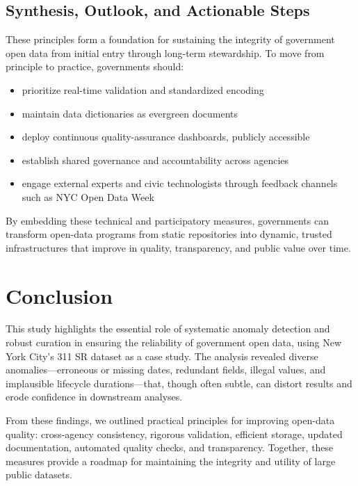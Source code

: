 \documentclass[linenumber]{jdsart}
\begin{document}
\subsection{Synthesis, Outlook, and Actionable Steps}
\label{subsec:actions}

These principles form a foundation for sustaining the integrity of government
open data from initial entry through long-term stewardship. To move from
principle to practice, governments should:

\begin{itemize}[left=1.5em]
  \item prioritize real-time validation and standardized encoding
  \item maintain data dictionaries as evergreen documents
  \item deploy continuous quality-assurance dashboards, publicly accessible
  \item establish shared governance and accountability across agencies
  \item engage external experts and civic technologists through feedback channels such as NYC Open Data Week
\end{itemize}

By embedding these technical and participatory measures, governments can
transform open-data programs from static repositories into dynamic, trusted
infrastructures that improve in quality, transparency, and public value over
time.




\section{Conclusion}
\label{sec:conclusion}
This study highlights the essential role of systematic anomaly detection and 
robust curation in ensuring the reliability of government open data, using 
New York City’s 311 SR dataset as a case study. 
The analysis revealed diverse anomalies—erroneous or missing dates, redundant 
fields, illegal values, and implausible lifecycle durations—that, though often subtle, can distort 
results and erode confidence in downstream analyses.

From these findings, we outlined practical principles for improving open-data 
quality: cross-agency consistency, rigorous validation, efficient storage, 
updated documentation, automated quality checks, and transparency. 
Together, these measures provide a roadmap for maintaining the integrity and 
utility of large public datasets.
\end{document}
